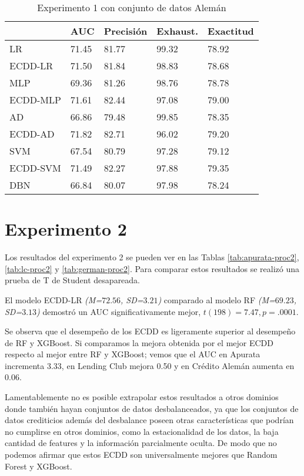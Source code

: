 \begin{table}[]
\centering
\caption{Experimento 1 con conjunto de datos Alemán}
\label{tab:german-proc1}
\begin{tabularx}{0.75\textwidth}{|l|Y Y Y Y|}
				\hline
				& AUC		& Precisión	& Exhaust.		& Exactitud	\\
				\hline
LR				& 71.45		& 81.77		& 99.32			& 78.92		\\
ECDD-LR			& 71.50		& 81.84		& 98.83			& 78.68		\\
				\hline
MLP				& 69.36		& 81.26		& 98.76			& 78.78		\\
ECDD-MLP		& 71.61		& 82.44		& 97.08			& 79.00		\\
				\hline
AD				& 66.86		& 79.48		& 99.85			& 78.35		\\
ECDD-AD			& 71.82		& 82.71		& 96.02			& 79.20		\\
				\hline
SVM				& 67.54		& 80.79		& 97.28			& 79.12		\\
ECDD-SVM		& 71.49		& 82.27		& 97.88			& 79.35		\\
				\hline
DBN				& 66.84		& 80.07		& 97.98			& 78.24		\\
				\hline
\end{tabularx}
\end{table}


\section{Experimento 2} %

Los resultados del experimento 2 se pueden ver en las Tablas \ref{tab:apurata-proc2}, \ref{tab:lc-proc2} y \ref{tab:german-proc2}. Para comparar estos resultados se realizó una prueba de T de Student desapareada.

El modelo ECDD-LR \textit{(M=$72.56$, SD=$3.21$)} comparado al modelo \ac{RF} \textit{(M=$69.23$, SD=$3.13$)} demostró un \ac{AUC} significativamente mejor, $t(198)=7.47, p=.0001$.

Se observa que el desempeño de los \ac{ECDD} es ligeramente superior al desempeño de \ac{RF} y \ac{XGBoost}. Si comparamos la mejora obtenida por el mejor \ac{ECDD} respecto al mejor entre RF y XGBoost; vemos que el AUC en Apurata incrementa 3.33, en Lending Club mejora 0.50 y en Crédito Alemán aumenta en 0.06.

Lamentablemente no es posible extrapolar estos resultados a otros dominios donde también hayan conjuntos de datos desbalanceados, ya que los conjuntos de datos crediticios además del desbalance poseen otras características que podrían no cumplirse en otros dominios, como la estacionalidad de los datos, la baja cantidad de features y la información parcialmente oculta. De modo que no podemos afirmar que estos \ac{ECDD} son universalmente mejores que Random Forest y XGBoost.

